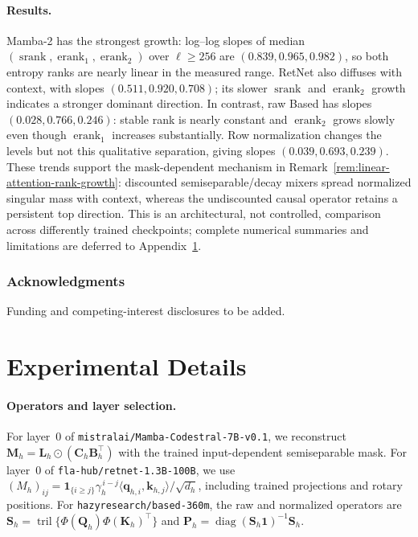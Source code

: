 \documentclass{article}
\newcommand{\diag}{\operatorname{diag}}
\newcommand{\srank}{\operatorname{srank}}
\newcommand{\erank}{\operatorname{erank}}
\newcommand{\one}{\mathbf{1}}
\newcommand{\hadamard}{\mathbin{\odot}}
\newcommand{\bB}{\mathbf{B}}
\newcommand{\bC}{\mathbf{C}}
\newcommand{\bM}{\mathbf{M}}
\newcommand{\bL}{\mathbf{L}}
\newcommand{\bP}{\mathbf{P}}
\newcommand{\bS}{\mathbf{S}}
\newcommand{\bQ}{\mathbf{Q}}
\newcommand{\bK}{\mathbf{K}}
\theoremstyle{definition}
\theoremstyle{remark}
\begin{document}
\paragraph{Results.}
Mamba-2 has the strongest growth: log--log slopes of median
$(\srank,\erank_1,\erank_2)$ over $\ell\geq256$ are
$(0.839,0.965,0.982)$, so both entropy ranks are nearly linear in the measured
range.  RetNet also diffuses with context, with slopes
$(0.511,0.920,0.708)$; its slower $\srank$ and $\erank_2$ growth indicates a
stronger dominant direction.  In contrast, raw Based has slopes
$(0.028,0.766,0.246)$: stable rank is nearly constant and $\erank_2$ grows
slowly even though $\erank_1$ increases substantially.  Row normalization
changes the levels but not this qualitative separation, giving slopes
$(0.039,0.693,0.239)$.  These trends support the mask-dependent mechanism in
Remark~\ref{rem:linear-attention-rank-growth}: discounted semiseparable/decay
mixers spread normalized singular mass with context, whereas the undiscounted
causal operator retains a persistent top direction.  This is an architectural,
not controlled, comparison across differently trained checkpoints; complete
numerical summaries and limitations are deferred to
Appendix~\ref{app:experimental-details}.

\FloatBarrier

\subsubsection*{Acknowledgments}
Funding and competing-interest disclosures to be added.




\appendix

\section{Experimental Details}
\label{app:experimental-details}

\paragraph{Operators and layer selection.}
For layer~0 of \texttt{mistralai/Mamba-Codestral-7B-v0.1}, we reconstruct
$\bM_h=\bL_h\hadamard(\bC_h\bB_h^\top)$ with the trained input-dependent
semiseparable mask.  For layer~0 of
\texttt{fla-hub/retnet-1.3B-100B}, we use
$(M_h)_{ij}=\one_{\{i\geq j\}}\gamma_h^{\,i-j}
\langle\mathbf q_{h,i},\mathbf k_{h,j}\rangle/\sqrt{d_h}$, including trained
projections and rotary positions.  For \texttt{hazyresearch/based-360m}, the
raw and normalized operators are
$\bS_h=\operatorname{tril}\{\Phi(\bQ_h)\Phi(\bK_h)^\top\}$ and
$\bP_h=\diag(\bS_h\mathbf 1)^{-1}\bS_h$.
\end{document}
